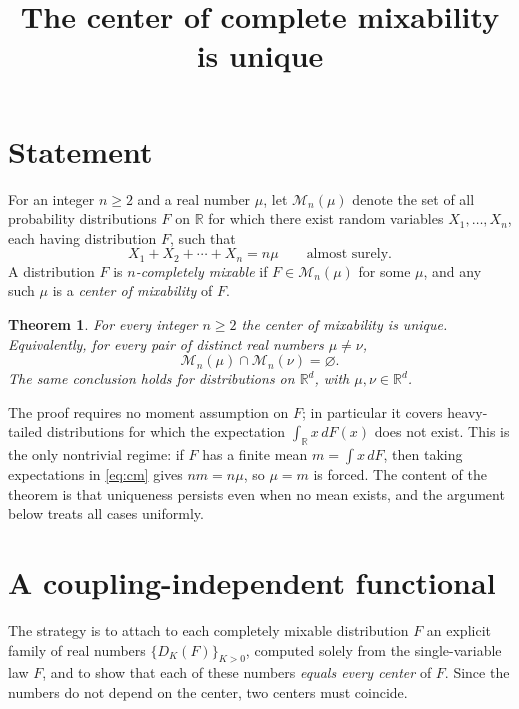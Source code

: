 \documentclass{amsart}
\newtheorem{theorem}{Theorem}
\theoremstyle{definition}
\theoremstyle{remark}
\begin{document}
\title{The center of complete mixability is unique}
\maketitle

\section{Statement}

For an integer $n\ge 2$ and a real number $\mu$, let $\mathcal{M}_n(\mu)$ denote
the set of all probability distributions $F$ on $\mathbb{R}$ for which there exist
random variables $X_1,\dots,X_n$, each having distribution $F$, such that
\begin{equation}\label{eq:cm}
X_1+X_2+\cdots+X_n = n\mu \qquad \text{almost surely.}
\end{equation}
A distribution $F$ is \emph{$n$-completely mixable} if $F\in\mathcal{M}_n(\mu)$ for
some $\mu$, and any such $\mu$ is a \emph{center of mixability} of $F$.

\begin{theorem}\label{thm:main}
For every integer $n\ge 2$ the center of mixability is unique. Equivalently, for
every pair of distinct real numbers $\mu\ne\nu$,
\[
\mathcal{M}_n(\mu)\cap\mathcal{M}_n(\nu)=\varnothing .
\]
The same conclusion holds for distributions on $\mathbb{R}^d$, with $\mu,\nu\in\mathbb{R}^d$.
\end{theorem}

The proof requires no moment assumption on $F$; in particular it covers heavy-tailed
distributions for which the expectation $\int_{\mathbb{R}} x\,dF(x)$ does not exist.
This is the only nontrivial regime: if $F$ has a finite mean $m=\int x\,dF$, then taking
expectations in \eqref{eq:cm} gives $nm=n\mu$, so $\mu=m$ is forced. The content of the
theorem is that uniqueness persists even when no mean exists, and the argument below
treats all cases uniformly.

\section{A coupling-independent functional}

The strategy is to attach to each completely mixable distribution $F$ an explicit family
of real numbers $\{D_K(F)\}_{K>0}$, computed solely from the single-variable law $F$, and
to show that each of these numbers \emph{equals every center} of $F$. Since the numbers do
not depend on the center, two centers must coincide.
\end{document}
